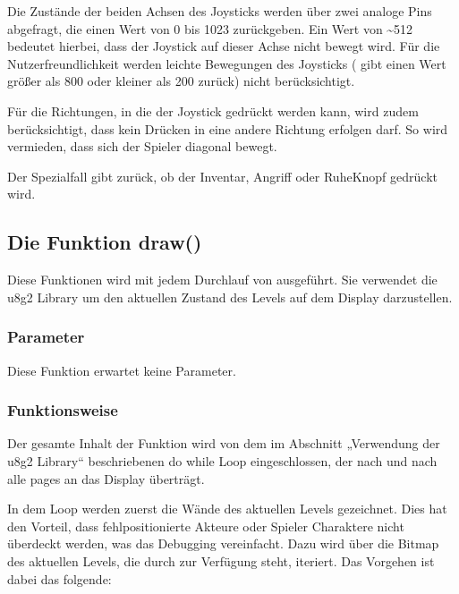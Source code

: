 \documentclass[letterpaper,10pt,ngerman]{sphinxmanual}
\let\sphinxpxdimen\pdfpxdimen\else\newdimen\sphinxpxdimen
\begin{document}
Die Zustände der beiden Achsen des Joysticks
werden über zwei analoge Pins abgefragt, die einen Wert von 0 bis 1023
zurückgeben. Ein Wert von \textasciitilde{}512 bedeutet hierbei, dass der Joystick auf dieser
Achse nicht bewegt wird. Für die Nutzerfreundlichkeit werden leichte Bewegungen
des Joysticks ( gibt einen Wert größer als 800 oder
kleiner als 200 zurück) nicht berücksichtigt.

Für die Richtungen, in die der Joystick gedrückt werden kann, wird zudem
berücksichtigt, dass kein Drücken in eine andere Richtung erfolgen darf. So
wird vermieden, dass sich der Spieler diagonal bewegt.

Der Spezialfall  gibt zurück, ob der Inventar\sphinxhyphen{}, Angriff\sphinxhyphen{} oder
Ruhe\sphinxhyphen{}Knopf gedrückt wird.


\subsection{Die Funktion draw()}
\label{\detokenize{programming:die-funktion-draw}}
Diese Funktionen wird mit jedem Durchlauf von  ausgeführt. Sie
verwendet die u8g2 Library um den aktuellen Zustand des Levels auf dem Display
darzustellen.


\subsubsection{Parameter}
\label{\detokenize{programming:id5}}
Diese Funktion erwartet keine Parameter.


\subsubsection{Funktionsweise}
\label{\detokenize{programming:id6}}
Der gesamte Inhalt der Funktion wird von dem im Abschnitt „Verwendung der u8g2
Library“ beschriebenen do while Loop eingeschlossen, der nach und nach alle
pages an das Display überträgt.

In dem Loop werden zuerst die Wände des aktuellen Levels gezeichnet. Dies hat
den Vorteil, dass fehlpositionierte Akteure oder Spieler Charaktere nicht
überdeckt werden, was das Debugging vereinfacht. Dazu wird über die Bitmap des
aktuellen Levels, die durch  zur Verfügung steht, iteriert. Das
Vorgehen ist dabei das folgende:

\noindent\sphinxincludegraphics[width=500\sphinxpxdimen]{{level}.png}
\end{document}
